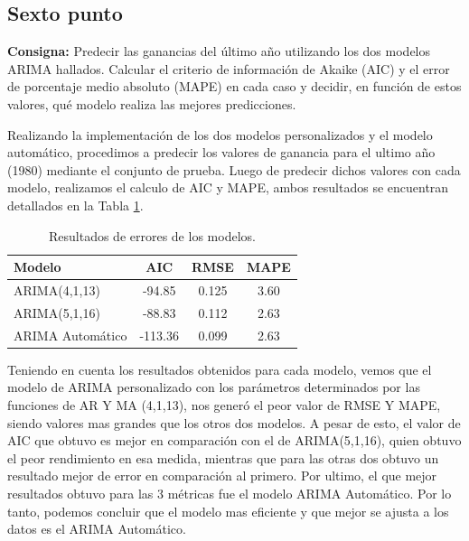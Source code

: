 \documentclass{article} %
\begin{document}
\subsection{Sexto punto}

\textbf{Consigna:} Predecir las ganancias del último año utilizando los dos modelos ARIMA hallados. Calcular el criterio de información de Akaike (AIC) y el error de porcentaje medio absoluto (MAPE) en cada caso y decidir, en función de estos valores, qué modelo realiza las mejores predicciones.

Realizando la implementación de los dos modelos personalizados y el modelo automático, procedimos a predecir los valores de ganancia para el ultimo año (1980) mediante el conjunto de prueba. Luego de predecir dichos valores con cada modelo, realizamos el calculo de AIC y MAPE, ambos resultados se encuentran detallados en la Tabla \ref{tab:table-punto-4-1}.

\begin{table}[H]
	\centering
		\begin{tabular}{||l || c || c || c ||}
			\hline
			\hline
			Modelo & AIC & RMSE & MAPE\\
			\hline			
			\hline
			ARIMA(4,1,13) & -94.85 & 0.125 & 3.60 \\
			\hline
			ARIMA(5,1,16)  & -88.83 & 0.112 & 2.63 \\
			\hline
			ARIMA Automático & -113.36 & 0.099 & 2.63 \\
			\hline
			\hline
		\end{tabular}
		\caption{Resultados de errores de los modelos.}
	\label{tab:table-punto-4-1}
\end{table}

Teniendo en cuenta los resultados obtenidos para cada modelo, vemos que el modelo de ARIMA personalizado con los parámetros determinados por las funciones de AR Y MA (4,1,13), nos generó el peor valor de RMSE Y MAPE, siendo valores mas grandes que los otros dos modelos. A pesar de esto, el valor de AIC que obtuvo es mejor en comparación con el de ARIMA(5,1,16), quien obtuvo el peor rendimiento en esa medida, mientras que para las otras dos obtuvo un resultado mejor de error en comparación al primero. Por ultimo, el que mejor resultados obtuvo para las 3 métricas fue el modelo ARIMA Automático. Por lo tanto, podemos concluir que el modelo mas eficiente y que mejor se ajusta a los datos es el ARIMA Automático.
\end{document}
